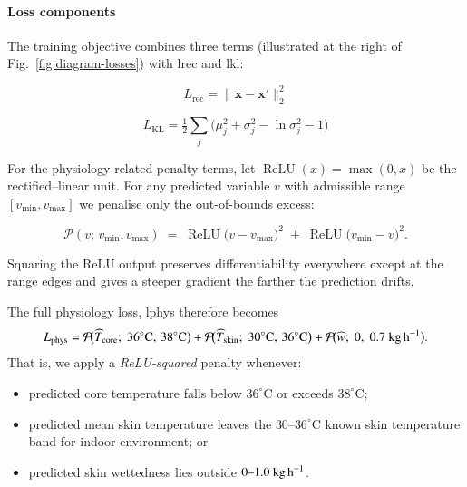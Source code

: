 \paragraph{Loss components}
The training objective combines three terms (illustrated at the right of Fig.~\ref{fig:diagram-losses}) with \gls{lrec} and \gls{lkl}:

    \begin{equation}
    L_{\text{rec}} = \lVert \mathbf x - \mathbf x' \rVert_2^{2}
    \end{equation}
    
    \begin{equation}    
    L_{\text{KL}}  = \tfrac12 \sum_{j}\!\bigl(\mu_j^{2} + \sigma_j^{2} - \ln\sigma_j^{2} - 1\bigr)\label{eq:kloss}
    \end{equation}
    
For the physiology-related penalty terms, let
\(
\operatorname{ReLU}(x)=\max(0,x)
\)
be the rectified–linear unit.  
For any predicted variable \(v\) with admissible range 
\([v_{\min},v_{\max}]\) 
we penalise only the out-of-bounds excess:

\begin{equation}
    \mathcal P(v;\,v_{\min},v_{\max})
        \;=\;
        \operatorname{ReLU}\!\bigl(v-v_{\max}\bigr)^{2}
        \;+\;
        \operatorname{ReLU}\!\bigl(v_{\min}-v\bigr)^{2}.
\end{equation}

\noindent
Squaring the ReLU output preserves differentiability everywhere
except at the range edges and gives a steeper gradient the farther the prediction drifts.

The full physiology loss, \gls{lphys} therefore becomes
\begin{equation}
  L_{\text{phys}} =
      \mathcal P\!\bigl(\widehat T_{\text{core}};\;36^{\circ}\text{C},\,38^{\circ}\text{C}\bigr)
    + \mathcal P\!\bigl(\widehat T_{\text{skin}};\;30^{\circ}\text{C},\,36^{\circ}\text{C}\bigr)
    + \mathcal P\!\bigl(\widehat w;\;0,\;0.7\ \text{kg\,h}^{-1}\bigr).\label{eq:phys_loss}
\end{equation}
\noindent
That is, we apply a \emph{ReLU‐squared} penalty whenever:
\begin{itemize}
    \item predicted core temperature falls below \(36^{\circ}\text{C}\) or exceeds \(38^{\circ}\text{C}\);
    \item predicted mean skin temperature leaves the \(30\mbox{–}36^{\circ}\text{C}\) known skin temperature band for indoor environment\cite{Fanger1970}; or
    \item predicted skin wettedness lies outside \(0\mbox{–}1.0\ \text{kg\,h}^{-1}\).
\end{itemize}


